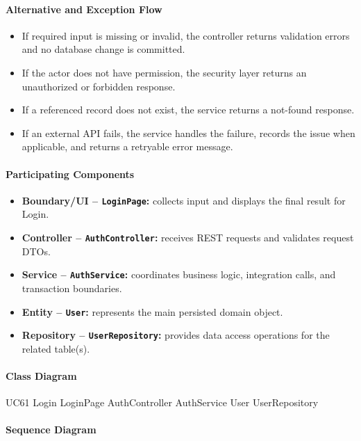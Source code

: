 \paragraph{Alternative and Exception Flow}

\begin{itemize}
    \item If required input is missing or invalid, the controller returns validation errors and no database change is committed.
    \item If the actor does not have permission, the security layer returns an unauthorized or forbidden response.
    \item If a referenced record does not exist, the service returns a not-found response.
    \item If an external API fails, the service handles the failure, records the issue when applicable, and returns a retryable error message.
\end{itemize}

\paragraph{Participating Components}

\begin{itemize}
    \item \textbf{Boundary/UI -- \texttt{LoginPage}:} collects input and displays the final result for Login.
    \item \textbf{Controller -- \texttt{AuthController}:} receives REST requests and validates request DTOs.
    \item \textbf{Service -- \texttt{AuthService}:} coordinates business logic, integration calls, and transaction boundaries.
    \item \textbf{Entity -- \texttt{User}:} represents the main persisted domain object.
    \item \textbf{Repository -- \texttt{UserRepository}:} provides data access operations for the related table(s).
\end{itemize}

\paragraph{Class Diagram}

\ClassDiagram
{UC61 Login}
{LoginPage}
{AuthController}
{AuthService}
{User}
{UserRepository}

\paragraph{Sequence Diagram}

